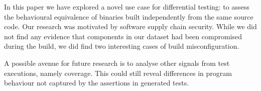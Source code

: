 \documentclass[conference]{IEEEtran}
\begin{document}
In this paper we have explored a novel use case for differential testing: to assess the behavioural equivalence of binaries built independently from the same source code. Our research was motivated by software supply chain security. While we did not find any evidence that components in our dataset had been compromised during the build, we did find two interesting cases of build misconfiguration.  

A possible avenue for future research is to analyse other signals from test executions, namely coverage. This could still reveal differences in program behaviour not captured by the assertions in generated tests. 





\end{document}
